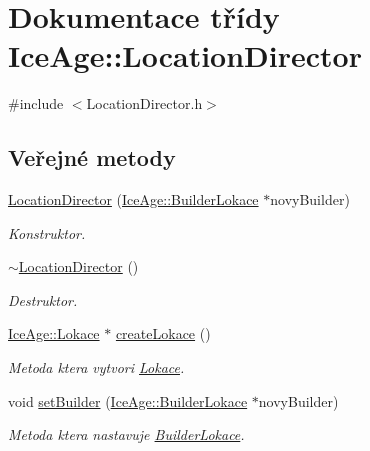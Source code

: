 \hypertarget{classIceAge_1_1LocationDirector}{}\section{Dokumentace třídy Ice\+Age\+:\+:Location\+Director}
\label{classIceAge_1_1LocationDirector}


{\ttfamily \#include $<$Location\+Director.\+h$>$}

\subsection*{Veřejné metody}
\begin{DoxyCompactItemize}
\item 
\hyperlink{classIceAge_1_1LocationDirector_a1b9d26b132d924914da5a760932ee64d}{Location\+Director} (\hyperlink{classIceAge_1_1BuilderLokace}{Ice\+Age\+::\+Builder\+Lokace} $\ast$novy\+Builder)
\begin{DoxyCompactList}\small\item\em Konstruktor. \end{DoxyCompactList}\item 
\hyperlink{classIceAge_1_1LocationDirector_a86ed70087306617e26540277f692ef68}{$\sim$\+Location\+Director} ()
\begin{DoxyCompactList}\small\item\em Destruktor. \end{DoxyCompactList}\item 
\hyperlink{classIceAge_1_1Lokace}{Ice\+Age\+::\+Lokace} $\ast$ \hyperlink{classIceAge_1_1LocationDirector_aaf149e550266d7934d8f227a0ec67953}{create\+Lokace} ()
\begin{DoxyCompactList}\small\item\em Metoda ktera vytvori \hyperlink{classIceAge_1_1Lokace}{Lokace}. \end{DoxyCompactList}\item 
void \hyperlink{classIceAge_1_1LocationDirector_ab9e7a61fc4e2860e674c7daa60d60bb3}{set\+Builder} (\hyperlink{classIceAge_1_1BuilderLokace}{Ice\+Age\+::\+Builder\+Lokace} $\ast$novy\+Builder)
\begin{DoxyCompactList}\small\item\em Metoda ktera nastavuje \hyperlink{classIceAge_1_1BuilderLokace}{Builder\+Lokace}. \end{DoxyCompactList}\end{DoxyCompactItemize}
